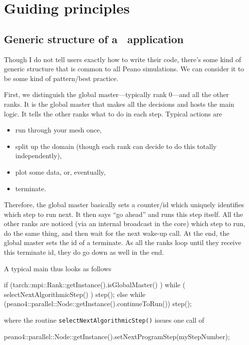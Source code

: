 \chapter{Guiding principles}


\section{Generic structure of a \Peano\  application}

Though I do not tell users exactly how to write their code, there's some kind of
generic structure that is common to all Peano simulations.
We can consider it to be some kind of pattern/best practice.


First, we distinguish the global master---typically rank 0---and all the other
ranks.
It is the global master that makes all the decisions and hosts the main logic.
It tells the other ranks what to do in each step. 
Typical actions are
\begin{itemize}
  \item run through your mesh once,
  \item split up the domain (though each rank can decide to do this totally
  independently),
  \item plot some data, or, eventually,
  \item terminate.
\end{itemize}


Therefore, the global master basically sets a counter/id which uniquely
identifies which step to run next.
It then says ``go ahead'' and runs this step itself.
All the other ranks are noticed (via an internal broadcast in the core) which
step to run, do the same thing, and then wait for the next wake-up call.
At the end, the global master sets the id of a terminate.
As all the ranks loop until they receive this terminate id, they do go down as
well in the end.


A typical main thus looks as follows
\begin{code}
  if (tarch::mpi::Rank::getInstance().isGlobalMaster() ) {
    while ( selectNextAlgorithmicStep() ) {
      step();
    }
  }
  else {
    while (peano4::parallel::Node::getInstance().continueToRun()) {
      step();
    }
  }
\end{code}


\noindent
where the routine \texttt{selectNextAlgorithmicStep()} issues one call of
\begin{code}
peano4::parallel::Node::getInstance().setNextProgramStep(myStepNumber);
\end{code}


